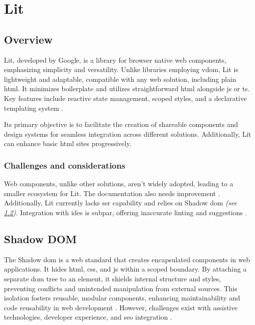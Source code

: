 \section{Lit}
\label{sec:lit}

\subsection{Overview}
\label{subsec:lit:overview}

Lit, developed by Google, is a library for browser native web components, emphasizing simplicity and versatility. Unlike libraries employing \acrshort{vdom}, Lit is lightweight and adaptable, compatible with any web solution, including plain \acrshort{html}. It minimizes boilerplate and utilizes straightforward \acrshort{html} alongside \acrshort{js} or \acrshort{ts}. Key features include reactive state management, scoped styles, and a declarative templating system \cite{lit:intro}.

Its primary objective is to facilitate the creation of shareable components and design systems for seamless integration across different solutions. Additionally, Lit can enhance basic \acrshort{html} sites progressively.

\subsubsection{Challenges and considerations}

Web components, unlike other solutions, aren't widely adopted, leading to a smaller ecosystem for Lit. The documentation also needs improvement \cite{github:issue_lit}. Additionally, Lit currently lacks \acrshort{ssr} capability and relies on Shadow \acrshort{dom} \textit{(see \ref{subsec:lit:shadow_dom})}. Integration with \acrshort{ide}s is subpar, offering inaccurate linting and suggestions \cite{lit:ssr, designsystemcentral:web_components, mitosis:overview}.

\subsection{Shadow DOM}
\label{subsec:lit:shadow_dom}

The Shadow \acrshort{dom} is a web standard that creates encapsulated components in web applications. It hides \acrshort{html}, \acrshort{css}, and \acrlong{js} within a scoped boundary. By attaching a separate \acrshort{dom} tree to an element, it shields internal structure and styles, preventing conflicts and unintended manipulation from external sources. This isolation fosters reusable, modular components, enhancing maintainability and code reusability in web development \cite{mdn:shadow_dom}. However, challenges exist with assistive technologies, developer experience, and \acrshort{seo} integration \cite{designsystemcentral:web_components, manuel:shadow_dom}.

